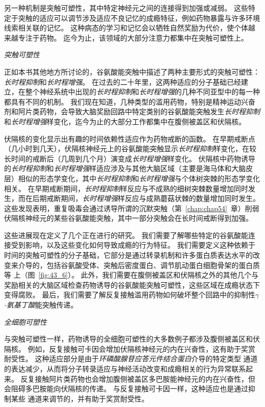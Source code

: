 另一种机制是突触可塑性，其中特定神经元之间的连接得到加强或减弱。
这些特定于突触的适应可以调节涉及适应不良记忆的成瘾特征，例如药物暴露与许多环境线索相关联的记忆。
这种病态的学习和记忆会以牺牲自然奖励为代价，使个体越来越专注于药物。
迄今为止，该领域的大部分注意力都集中在突触可塑性上。


\textit{突触可塑性}

正如本书其他地方所讨论的，谷氨酸能突触中描述了两种主要形式的突触可塑性：
\textit{长时程抑制}和\textit{长时程增强}。
在过去的二十年里，这两种适应的分子基础已经建立，在整个神经系统中出现的\textit{长时程抑制}和\textit{长时程增强}的几种不同亚型中的每一种都具有不同的机制。
我们现在知道，几种类型的滥用药物，特别是精神运动兴奋剂和阿片类药物，会导致大脑奖励回路中特定类别的谷氨酸能突触发生\textit{长时程抑制}和\textit{长时程增强}样变化，迄今为止的大部分工作都集中在腹侧被盖区和伏隔核。


伏隔核的变化显示出有趣的时间依赖性适应作为药物戒断的函数。
在早期戒断点（几小时到几天），伏隔核神经元上的谷氨酸能突触显示\textit{长时程抑制}样变化，在较长时间的戒断后（几周到几个月）演变成\textit{长时程增强}样变化。
伏隔核中药物诱导的\textit{长时程抑制}和\textit{长时程增强}样适应涉及与其他大脑区域（主要是海马体和大脑皮层）相似的形态学变化，其中\textit{长时程抑制}和\textit{长时程增强}与个体树突棘的形态学变化相关。
在早期戒断期间，\textit{长时程抑制}样反应与不成熟的细树突棘数量增加同时发生，而在后期戒断期间，\textit{长时程增强}样反应与成熟蘑菇状棘的数量增加同时发生。
这些发现表明，重复吸毒会通过诱导所谓的沉默突触（第~\ref{chap:chap54}~章）削弱伏隔核神经元的某些谷氨酸能突触，其中一部分突触会在长时间戒断得到加强。


这些进展现在定义了几个正在进行的研究。
我们需要了解哪些特定的谷氨酸能连接受到影响，以及这些变化如何导致成瘾的行为特征。
我们需要定义这种依赖于时间的突触可塑性的分子基础，它部分是通过转录机制和许多蛋白质表达水平的改变来介导的，包括谷氨酸受体、突触后密度蛋白、调节肌动蛋白细胞骨架的蛋白质等 上（图~\ref{fig:43_6}）。
此外，我们需要在腹侧被盖区和伏隔核之外的其他几个与奖励相关的大脑区域检查药物诱导的谷氨酸能突触可塑性，这些区域在成瘾状态下变得腐败。
最后，我们需要了解反复接触滥用药物如何破坏整个回路中的抑制性\textit{$\gamma$-氨基丁酸}能突触传递。


\textit{全细胞可塑性}

与突触可塑性一样，药物诱导的全细胞可塑性的大多数例子都涉及腹侧被盖区和伏隔核。
例如，反复接触可卡因会增加伏隔核神经元的内在兴奋性，这有助于奖赏耐受性。
这种适应部分是由于\textit{环磷酸腺苷应答元件结合蛋白}介导的特定类型  通道的表达减少，从而将分子转录适应与神经活动改变和成瘾相关的行为异常联系起来。
反复接触阿片类药物也会增加腹侧被盖区多巴胺能神经元的内在兴奋性，但会阻碍多巴胺能向伏隔核的传递。
与反复接触可卡因一样，这种适应也是通过抑制某些  通道来调节的，并有助于奖赏耐受性。


